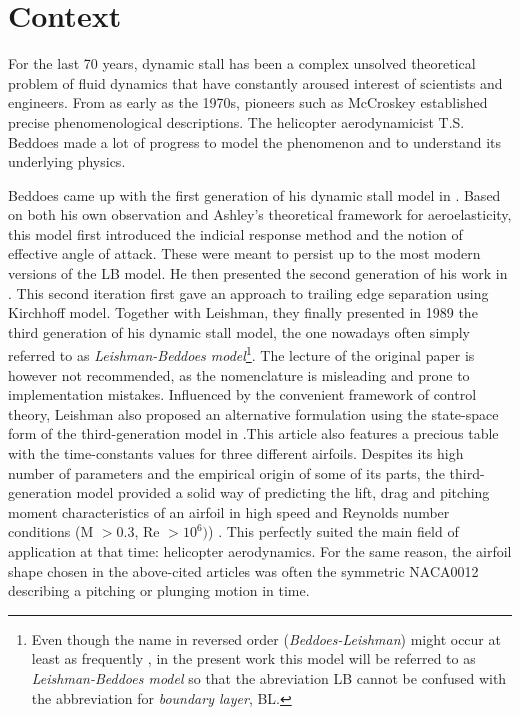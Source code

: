 \section{Context}
For the last 70 years, dynamic stall has been a complex unsolved theoretical problem of fluid dynamics that have constantly aroused interest of scientists and engineers. From as early as the 1970s, pioneers such as McCroskey \cite{mccroskey_dynamic_1976} established precise phenomenological descriptions. The helicopter aerodynamicist T.S. Beddoes made a lot of progress to model the phenomenon and to understand its underlying physics. 

Beddoes came up with the first generation of his dynamic stall model in \cite{beddoes_synthesis_1976}. Based on both his own observation and Ashley's theoretical framework for aeroelasticity, this model first introduced the indicial response method and the notion of effective angle of attack. These were meant to persist up to the most modern versions of the LB model. He then presented the second generation of his work in \cite{beddoes_representation_1983}. This second iteration first gave an approach to  trailing edge separation using Kirchhoff model. Together with Leishman, they finally presented in 1989 the third generation of his dynamic stall model, the one nowadays often simply referred to  as \textit{Leishman-Beddoes model}\footnote{Even though the name in reversed order (\textit{Beddoes-Leishman}) might occur at least as frequently , in the present work this model will be referred to as \textit{Leishman-Beddoes model} so that the abreviation LB cannot be confused with the abbreviation for \textit{boundary layer}, BL.}. The  lecture of the original paper \cite{leishman_semi-empirical_1989} is however not recommended, as the nomenclature is misleading and prone to implementation mistakes. Influenced by the convenient framework of control theory, Leishman also proposed an alternative formulation using the state-space form of the third-generation model in \cite{leishman_state-space_1989}.This article also features a precious table with the time-constants values for three different airfoils. Despites its high number of parameters and the empirical origin of some of its parts, the third-generation model provided a solid way of predicting the lift, drag and pitching moment characteristics of an airfoil in high speed and Reynolds number conditions (M $>0.3$, Re $> 10^6)$) . This perfectly suited the main field of application at that time: helicopter aerodynamics. For the same reason, the airfoil shape chosen in the above-cited articles was often the symmetric NACA0012 describing a pitching or plunging motion in time. 

